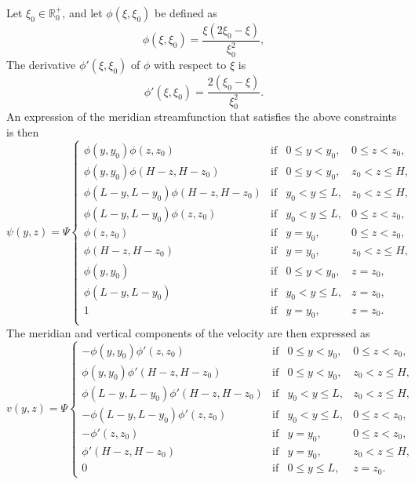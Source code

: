Let $\xi_0 \in \mathbb{R}_0^+$, and let $\phi(\xi,\xi_0)$ be defined as
\begin{equation} \label{eq:phi}
	\phi(\xi,\xi_0) = \frac{\xi(2\xi_0-\xi)}{\xi_0^2},
\end{equation}
The derivative $\phi'(\xi,\xi_0)$ of $\phi$ with respect to $\xi$ is
\begin{equation}
	\phi'(\xi,\xi_0) = \frac{2(\xi_0-\xi)}{\xi_0^2}.
\end{equation}
An expression of the meridian streamfunction that satisfies the above constraints is then
\begin{equation} \label{eq:psi_overturner}
	\psi(y,z) = \Psi\left\{ 
		\begin{array}{lrrr}
			\phi(y,y_0)\phi(z,z_0) & \mbox{if} & 0 \le y < y_0, & 0 \le z < z_0,\\
			\phi(y,y_0)\phi(H-z,H-z_0) & \mbox{if} & 0 \le y < y_0, & z_0 < z \le H,\\
			\phi(L-y,L-y_0)\phi(H-z,H-z_0) & \mbox{if} & y_0 < y \le L, &z_0 < z \le H,\\
			\phi(L-y,L-y_0)\phi(z,z_0) & \mbox{if} & y_0 < y \le L, & 0 \le z < z_0,\\
			\phi(z,z_0) & \mbox{if} & y = y_0, & 0 \le z < z_0,\\
			\phi(H-z,H-z_0) & \mbox{if} & y = y_0, & z_0 < z \le H,\\
			\phi(y,y_0) & \mbox{if} & 0 \le y < y_0, & z = z_0,\\
			\phi(L-y,L-y_0) & \mbox{if} & y_0 < y \le L, & z=z_0,\\
			1 & \mbox{if} & y = y_0, & z=z_0.\\
		\end{array}
	\right.
\end{equation}
The meridian and vertical components of the velocity are then expressed as
\begin{equation} \label{eq:v_overturner}
	v(y,z) = \Psi\left\{ 
		\begin{array}{lrrr}
			- \phi(y,y_0)\phi'(z,z_0) & \mbox{if} & 0 \le y < y_0, & 0 \le z < z_0,\\
			\phi(y,y_0)\phi'(H-z,H-z_0) & \mbox{if} & 0 \le y < y_0, & z_0 < z \le H,\\
			\phi(L-y,L-y_0)\phi'(H-z,H-z_0) & \mbox{if} & y_0 < y \le L, & z_0 < z \le H,\\
			- \phi(L-y,L-y_0)\phi'(z,z_0) & \mbox{if} & y_0 < y \le L, & 0 \le z < z_0,\\
			- \phi'(z,z_0) & \mbox{if} & y = y_0, & 0 \le z < z_0,\\
			\phi'(H-z,H-z_0) & \mbox{if} & y = y_0, & z_0 < z \le H,\\
			0 & \mbox{if} &0 \le y \le L, & z = z_0.
		\end{array}
	\right.
\end{equation}

